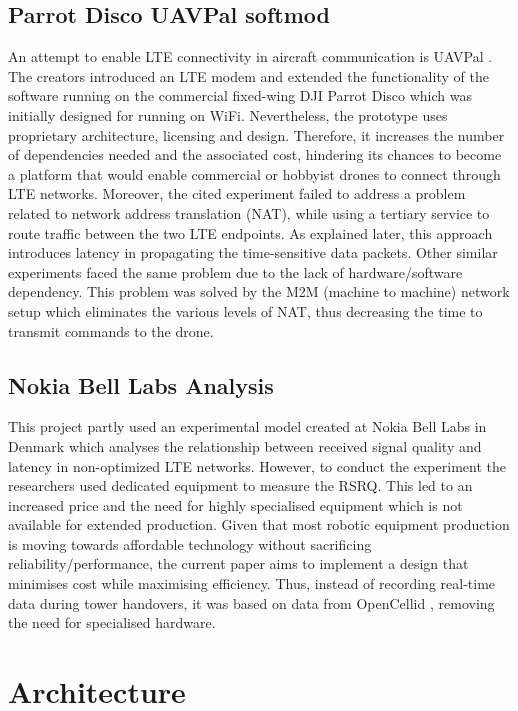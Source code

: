 \documentclass{IEEEtran}
\begin{document}
\subsection{Parrot Disco UAVPal softmod}
An attempt to enable LTE connectivity in aircraft communication is UAVPal \citep{uavpal_2019_uavpaldisco4g}. The creators introduced an LTE modem and extended the functionality of the software running on the commercial fixed-wing DJI Parrot Disco which was initially designed for running on WiFi. Nevertheless, the prototype uses proprietary architecture, licensing and design. Therefore, it increases the number of dependencies needed and the associated cost, hindering its chances to become a platform that would enable commercial or hobbyist drones to connect through LTE networks. 
\newline
\newline
Moreover, the cited experiment failed to address a problem related to network address translation (NAT), while using a tertiary service to route traffic between the two LTE endpoints. As explained later, this approach introduces latency in propagating the time-sensitive data packets. Other similar experiments faced the same problem due to the lack of hardware/software dependency. This problem was solved by the M2M (machine to machine) network setup which eliminates the various levels of NAT, thus decreasing the time to transmit commands to the drone.
\subsection{Nokia Bell Labs Analysis}
This project partly used an experimental model created at Nokia Bell Labs in Denmark \citep{amorim_2018_measured} which analyses the relationship between received signal quality and latency in non-optimized LTE networks. However, to conduct the experiment the researchers used dedicated equipment to measure the RSRQ. This led to an increased price and the need for highly specialised equipment which is not available for extended production. Given that most robotic equipment production is moving towards affordable technology without sacrificing reliability/performance, the current paper aims to implement a design that minimises cost while maximising efficiency. Thus, instead of recording real-time data during tower handovers, it was based on data from OpenCellid \citep{a2020_opencellid}, removing the need for specialised hardware.
\clearpage

\section{Architecture}
\end{document}
